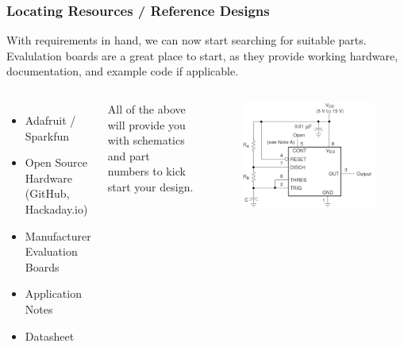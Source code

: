 \documentclass[aspectratio=169, t]{beamer}
\begin{document}
\begin{frame}
\frametitle{Locating Resources / Reference Designs}
With requirements in hand, we can now start searching for suitable parts.\\
Evalulation boards are a great place to start, as they provide working hardware, documentation, and example code if applicable.\\[10pt]
\begin{columns}
		\vspace{-7mm}
		\begin{itemize}
			\item Adafruit / Sparkfun
			\item Open Source Hardware (GitHub, Hackaday.io)
			\item Manufacturer Evaluation Boards
			\item Application Notes
			\item Datasheet
		\end{itemize}
		\vspace{2mm}
		All of the above will provide you with schematics and part numbers to kick start your design.

	\vspace{-8mm}
		\begin{figure}
			\includegraphics[width=0.8\linewidth]{images/tlc555-appnote.png}
		\end{figure}
\end{columns}
\end{frame}
\end{document}
